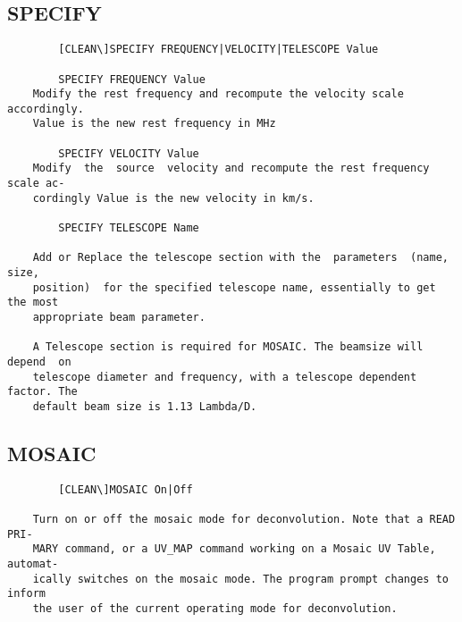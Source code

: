 \subsection{SPECIFY}
\begin{verbatim}
        [CLEAN\]SPECIFY FREQUENCY|VELOCITY|TELESCOPE Value

        SPECIFY FREQUENCY Value
    Modify the rest frequency and recompute the velocity scale  accordingly.
    Value is the new rest frequency in MHz

        SPECIFY VELOCITY Value
    Modify  the  source  velocity and recompute the rest frequency scale ac-
    cordingly Value is the new velocity in km/s.

        SPECIFY TELESCOPE Name

    Add or Replace the telescope section with the  parameters  (name,  size,
    position)  for the specified telescope name, essentially to get the most
    appropriate beam parameter.

    A Telescope section is required for MOSAIC. The beamsize will depend  on
    telescope diameter and frequency, with a telescope dependent factor. The
    default beam size is 1.13 Lambda/D.

\end{verbatim}
\subsection{MOSAIC}
\begin{verbatim}
        [CLEAN\]MOSAIC On|Off

    Turn on or off the mosaic mode for deconvolution. Note that a READ  PRI-
    MARY command, or a UV_MAP command working on a Mosaic UV Table, automat-
    ically switches on the mosaic mode. The program prompt changes to inform
    the user of the current operating mode for deconvolution.


\end{verbatim}
